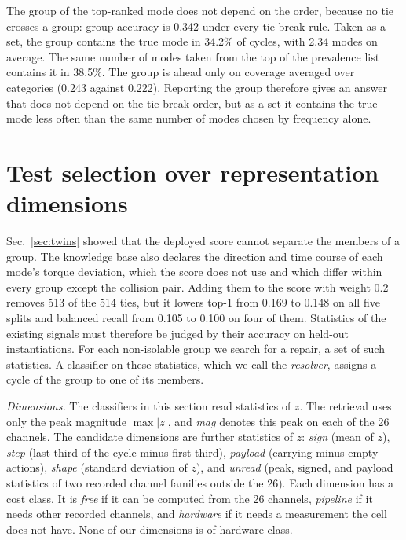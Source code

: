 \documentclass{ifacconf}
\begin{document}
The group of the top-ranked mode does not depend on the order, because no tie
crosses a group: group accuracy is 0.342 under every tie-break rule. Taken as a
set, the group contains the true mode in 34.2\% of cycles, with 2.34 modes on
average. The same number of modes taken from the top of the prevalence list
contains it in 38.5\%. The group is ahead only on coverage averaged over
categories (0.243 against 0.222). Reporting the group therefore gives an answer
that does not depend on the tie-break order, but as a set it contains the true
mode less often than the same number of modes chosen by frequency alone.

\section{Test selection over representation dimensions}
\label{sec:repair}

Sec.~\ref{sec:twins} showed that the deployed score cannot separate the members
of a group. The knowledge base also declares the direction and time course of
each mode's torque deviation, which the score does not use and which differ
within every group except the collision pair. Adding them to the score with
weight 0.2 removes 513 of the 514 ties, but it lowers top-1 from 0.169 to 0.148
on all five splits and balanced recall from 0.105 to 0.100 on four of them.
Statistics of the existing signals must therefore be judged by their accuracy on
held-out instantiations. For each non-isolable group we search for a repair, a
set of such statistics. A classifier on these statistics, which we call the
\emph{resolver}, assigns a cycle of the group to one of its members.

\emph{Dimensions.} The classifiers in this section read statistics of $z$. The
retrieval uses only the peak magnitude $\max|z|$, and \emph{mag} denotes this
peak on each of the 26 channels. The candidate dimensions are further statistics
of $z$: \emph{sign} (mean of $z$), \emph{step} (last third of the cycle minus
first third), \emph{payload} (carrying minus empty actions), \emph{shape}
(standard deviation of $z$), and \emph{unread} (peak, signed, and payload
statistics of two recorded channel families outside the 26). Each dimension has
a cost class. It is \emph{free} if it can be computed from the 26 channels,
\emph{pipeline} if it needs other recorded channels, and \emph{hardware} if it
needs a measurement the cell does not have. None of our dimensions is of
hardware class.
\end{document}
